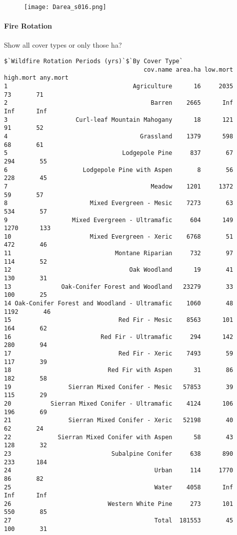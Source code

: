 \begin{figure}
\texttt{[image: Darea\_s016.png]}
\caption{}
\label{darea}
\end{figure}

\paragraph{Fire Rotation}
Show all cover types or only those  ha?

\begin{verbatim}
$`Wildfire Rotation Periods (yrs)`$`By Cover Type`
                                       cov.name area.ha low.mort high.mort any.mort
1                                   Agriculture      16     2035        73       71
2                                        Barren    2665      Inf       Inf      Inf
3                   Curl-leaf Mountain Mahogany      18      121        91       52
4                                     Grassland    1379      598        68       61
5                                Lodgepole Pine     837       67       294       55
6                     Lodgepole Pine with Aspen       8       56       228       45
7                                        Meadow    1201     1372        59       57
8                       Mixed Evergreen - Mesic    7273       63       534       57
9                  Mixed Evergreen - Ultramafic     604      149      1270      133
10                      Mixed Evergreen - Xeric    6768       51       472       46
11                             Montane Riparian     732       97       114       52
12                                 Oak Woodland      19       41       130       31
13              Oak-Conifer Forest and Woodland   23279       33       100       25
14 Oak-Conifer Forest and Woodland - Ultramafic    1060       48      1192       46
15                              Red Fir - Mesic    8563      101       164       62
16                         Red Fir - Ultramafic     294      142       280       94
17                              Red Fir - Xeric    7493       59       117       39
18                           Red Fir with Aspen      31       86       182       58
19                Sierran Mixed Conifer - Mesic   57853       39       115       29
20           Sierran Mixed Conifer - Ultramafic    4124      106       196       69
21                Sierran Mixed Conifer - Xeric   52198       40        62       24
22             Sierran Mixed Conifer with Aspen      58       43       128       32
23                            Subalpine Conifer     638      890       233      184
24                                        Urban     114     1770        86       82
25                                        Water    4058      Inf       Inf      Inf
26                           Western White Pine     273      101       550       85
27                                        Total  181553       45       100       31
\end{verbatim}


